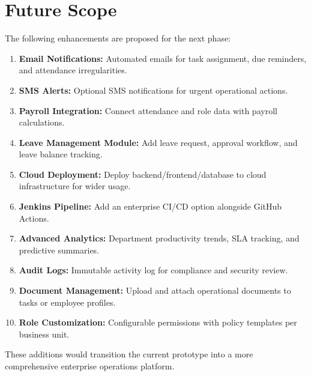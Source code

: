 \chapter{Future Scope}

The following enhancements are proposed for the next phase:

\begin{enumerate}[leftmargin=1.3cm]
\item \textbf{Email Notifications:} Automated emails for task assignment, due reminders, and attendance irregularities.
\item \textbf{SMS Alerts:} Optional SMS notifications for urgent operational actions.
\item \textbf{Payroll Integration:} Connect attendance and role data with payroll calculations.
\item \textbf{Leave Management Module:} Add leave request, approval workflow, and leave balance tracking.
\item \textbf{Cloud Deployment:} Deploy backend/frontend/database to cloud infrastructure for wider usage.
\item \textbf{Jenkins Pipeline:} Add an enterprise CI/CD option alongside GitHub Actions.
\item \textbf{Advanced Analytics:} Department productivity trends, SLA tracking, and predictive summaries.
\item \textbf{Audit Logs:} Immutable activity log for compliance and security review.
\item \textbf{Document Management:} Upload and attach operational documents to tasks or employee profiles.
\item \textbf{Role Customization:} Configurable permissions with policy templates per business unit.
\end{enumerate}

These additions would transition the current prototype into a more comprehensive enterprise operations platform.
